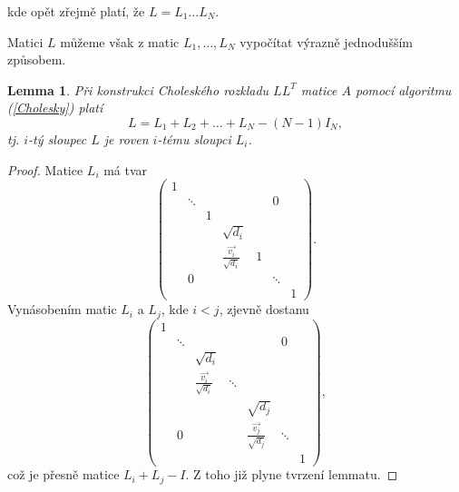 \documentclass[11pt,american,czech,oneside]{book}
\theoremstyle{plain}
\newtheorem{lemma}{Lemma}
\theoremstyle{definition}
\begin{document}
kde opět zřejmě platí, že $L=L_1...L_N$.

\medskip

Matici $L$ můžeme však z matic $L_1,\ldots,L_N$ vypočítat výrazně jednodušším způsobem.

\begin{lemma}
\label{Lsoucet}
    Při konstrukci Choleského rozkladu $LL^T$ matice $A$ pomocí algoritmu (\ref{Cholesky}) platí
    \begin{equation}
      L = L_1 + L_2 + \ldots + L_N - (N-1)I_N,
    \end{equation}
    tj. $i$-tý sloupec $L$ je roven $i$-tému sloupci $L_i$.
\end{lemma}
\begin{proof}
  Matice $L_i$ má tvar
  \[
  \left(
  \begin{matrix}
    1 &        &   &                              &   &        &   \\
      & \ddots &   &                              &   & 0      &   \\
      &        & 1 &                              &   &        &   \\
      &        &   & \sqrt{d_i}                   &   &        &   \\
      &        &   & \frac{\vec{v_i}}{\sqrt{d_i}} & 1 &        &   \\
      & 0      &   &                              &   & \ddots &   \\
      &        &   &                              &   &        & 1
  \end{matrix}
  \right).
  \]
  Vynásobením matic $L_i$ a $L_j$, kde $i < j$, zjevně dostanu
  \[
  \left(
  \begin{matrix}
    1 &        &   &                              &   &        &   \\
      & \ddots &   &                              &   & 0      &   \\
      &        & \sqrt{d_i} &     &   &        &   \\
      &        & \frac{\vec{v_i}}{\sqrt{d_i}}  &     \ddots               &   &        &   \\
      &        &   &  & \sqrt{d_j} &        &   \\
      & 0      &   &  & \frac{\vec{v_j}}{\sqrt{d_j}}  & \ddots &   \\
      &        &   &  &   &        & 1
  \end{matrix}
  \right),
  \]
  což je přesně matice $L_i + L_j - I$.
  Z toho již plyne tvrzení lemmatu.
\end{proof}
\end{document}
